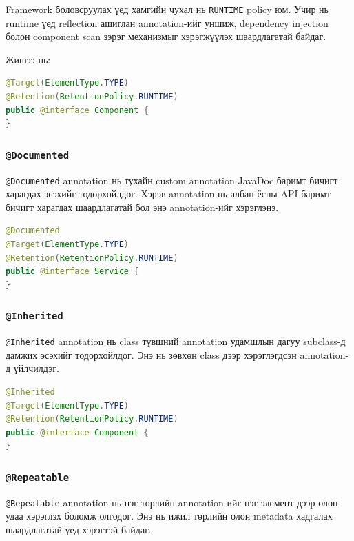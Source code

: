 \newpage
Framework боловсруулах үед хамгийн чухал нь \texttt{RUNTIME} policy юм.
Учир нь runtime үед reflection ашиглан annotation-ийг уншиж,
dependency injection болон component scan зэрэг механизмыг хэрэгжүүлэх
шаардлагатай байдаг.

Жишээ нь:

\begin{lstlisting}[language=Java, caption={\texttt{@Retention} ашигласан жишээ}, label={lst:retention-example}]
@Target(ElementType.TYPE)
@Retention(RetentionPolicy.RUNTIME)
public @interface Component {
}
\end{lstlisting}

\subsubsection{\texttt{@Documented}}

\texttt{@Documented} annotation нь тухайн custom annotation JavaDoc баримт бичигт харагдах эсэхийг тодорхойлдог. Хэрэв annotation нь албан ёсны API баримт бичигт харагдах шаардлагатай бол энэ annotation-ийг хэрэглэнэ.

\begin{lstlisting}[language=Java, caption={\texttt{@Documented} ашигласан жишээ}, label={lst:documented-example}]
@Documented
@Target(ElementType.TYPE)
@Retention(RetentionPolicy.RUNTIME)
public @interface Service {
}
\end{lstlisting}

\subsubsection{\texttt{@Inherited}}

\texttt{@Inherited} annotation нь class түвшний annotation удамшлын дагуу subclass-д дамжих эсэхийг тодорхойлдог. Энэ нь зөвхөн class дээр хэрэглэгдсэн annotation-д үйлчилдэг.

\begin{lstlisting}[language=Java, caption={\texttt{@Inherited} ашигласан жишээ}, label={lst:inherited-example}]
@Inherited
@Target(ElementType.TYPE)
@Retention(RetentionPolicy.RUNTIME)
public @interface Component {
}
\end{lstlisting}

\subsubsection{\texttt{@Repeatable}}

\texttt{@Repeatable} annotation нь нэг төрлийн annotation-ийг нэг элемент дээр олон удаа хэрэглэх боломж олгодог. Энэ нь ижил төрлийн олон metadata хадгалах шаардлагатай үед хэрэгтэй байдаг.

